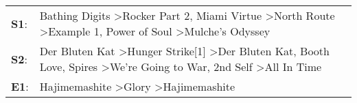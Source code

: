\begin{supertabular}{p{0.03\textwidth}p{0.92\textwidth}}
 \textbf{S1}:  &                                        Bathing Digits\textsuperscript{} \textgreater \enspace Rocker Part 2\textsuperscript{}, \enspace Miami Virtue\textsuperscript{} \textgreater \enspace North Route\textsuperscript{} \textgreater \enspace Example 1\textsuperscript{}, \enspace Power of Soul\textsuperscript{} \textgreater \enspace Mulche's Odyssey\textsuperscript{}  \enspace  \\
 \textbf{S2}:  &  Der Bluten Kat\textsuperscript{} \textgreater \enspace Hunger Strike[1]\textsuperscript{} \textgreater \enspace Der Bluten Kat\textsuperscript{}, \enspace Booth Love\textsuperscript{}, \enspace Spires\textsuperscript{} \textgreater \enspace We're Going to War\textsuperscript{}, \enspace 2nd Self\textsuperscript{} \textgreater \enspace All In Time\textsuperscript{}  \enspace  \\
 \textbf{E1}:  &                                                                                                                                                                                                                                             Hajimemashite\textsuperscript{} \textgreater \enspace Glory\textsuperscript{} \textgreater \enspace Hajimemashite\textsuperscript{}  \enspace  \\
\end{supertabular}
